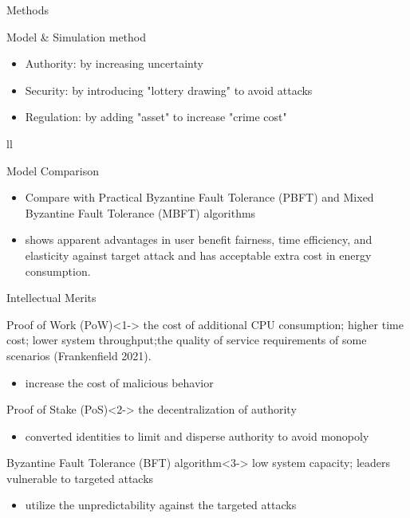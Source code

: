 \documentclass{beamer}
\begin{document}
		\begin{frame}[fragile]{Methods}
		\begin{exampleblock}{Model \& Simulation method}
			\centering
			\footnotesize
			\begin{itemize}
			    \item Authority: by increasing uncertainty
			     \item Security: by introducing "lottery drawing" to avoid attacks
			     \item Regulation: by adding "asset" to increase "crime cost"
			\end{itemize}{ll}
			
		\end{exampleblock}
		\begin{exampleblock}{Model Comparison}
			\centering
			\footnotesize
			\begin{itemize}
			    \item Compare with Practical Byzantine Fault Tolerance (PBFT) and Mixed Byzantine Fault Tolerance (MBFT) algorithms
			    \item shows apparent advantages in user benefit fairness, time efficiency, and elasticity against target attack and has acceptable extra cost in energy consumption.
			\end{itemize}
				
		\end{exampleblock}
	\end{frame}
	
		\begin{frame}{ Intellectual Merits}
		 \begin{block}{Proof of Work (PoW)}<1->
		   the cost of additional CPU consumption; higher time cost; lower system throughput;the quality of service requirements of some scenarios (Frankenfield 2021).
		   \begin{itemize}
		       \item increase the cost of malicious behavior
		   \end{itemize}
		 \end{block}
	       
		\begin{block}{ Proof of Stake (PoS)}<2->
            the decentralization of authority
            \begin{itemize}
                \item converted identities to limit and disperse authority to avoid monopoly
            \end{itemize}
        \end{block}
    	
		\begin{block}{Byzantine Fault Tolerance (BFT) algorithm}<3->
		  low system capacity; leaders vulnerable to targeted attacks  
		  \begin{itemize}
		       \item utilize the  unpredictability against the targeted attacks
		   \end{itemize}
		\end{block}
       
	\end{frame}
	
\end{document}
